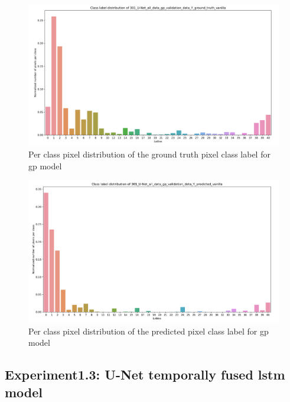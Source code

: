 	\begin{figure}
		\centering
		\includegraphics[width=16cm]{images/Y_ground_truth_gp.png}
		\caption{Per class pixel distribution of the ground truth pixel class label for gp model}
		\label{fig:y_gt_gp}
	\end{figure}
	
	\begin{figure}
		\centering
		\includegraphics[width=16cm]{images/Y_predicted_gp.png}
		\caption{Per class pixel distribution of the predicted pixel class label for gp model}
		\label{fig:y_predi_gp}
	\end{figure}

    \subsection{Experiment1.3: U-Net temporally fused lstm model}
    
